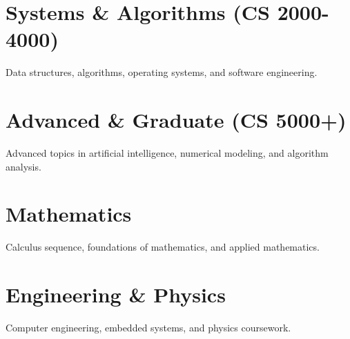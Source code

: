 \documentclass[12pt,oneside]{scrbook}
\begin{document}
\section*{Systems \& Algorithms (CS 2000-4000)}  
Data structures, algorithms, operating systems, and software engineering.

\section*{Advanced \& Graduate (CS 5000+)}
Advanced topics in artificial intelligence, numerical modeling, and algorithm analysis.

\section*{Mathematics}
Calculus sequence, foundations of mathematics, and applied mathematics.

\section*{Engineering \& Physics}
Computer engineering, embedded systems, and physics coursework.
\end{document}
